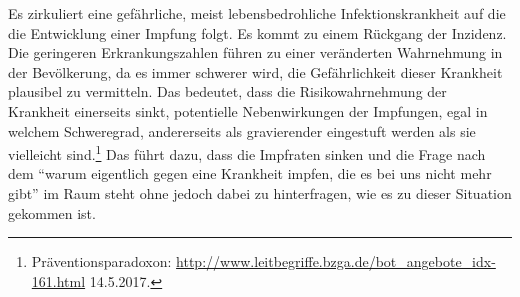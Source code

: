 \documentclass[
    a4paper,
    12pt,
    hyphens,
    chapterprefix=true,
    headheight=33pt,
    footheight=29pt,
    headings=optiontohead,
]{scrartcl}
\begin{document}
{Es zirkuliert eine gefährliche, meist lebensbedrohliche Infektionskrankheit auf die die Entwicklung einer Impfung folgt. Es kommt zu einem Rückgang der Inzidenz. Die geringeren Erkrankungszahlen führen zu einer veränderten Wahrnehmung in der Bevölkerung, da es immer schwerer wird, die Gefährlichkeit dieser Krankheit plausibel zu vermitteln. Das bedeutet, dass die Risikowahrnehmung der Krankheit einerseits sinkt, potentielle Nebenwirkungen der Impfungen, egal in welchem Schweregrad, andererseits als gravierender eingestuft werden als sie vielleicht sind.\footnote{Präventionsparadoxon: \url{http://www.leitbegriffe.bzga.de/bot_angebote_idx-161.html} 14.5.2017.} Das führt dazu, dass die Impfraten sinken und die Frage nach dem "`warum eigentlich gegen eine Krankheit impfen, die es bei uns nicht mehr gibt"' im Raum steht ohne jedoch dabei zu hinterfragen, wie es zu dieser Situation gekommen ist.\\

}
\end{document}
